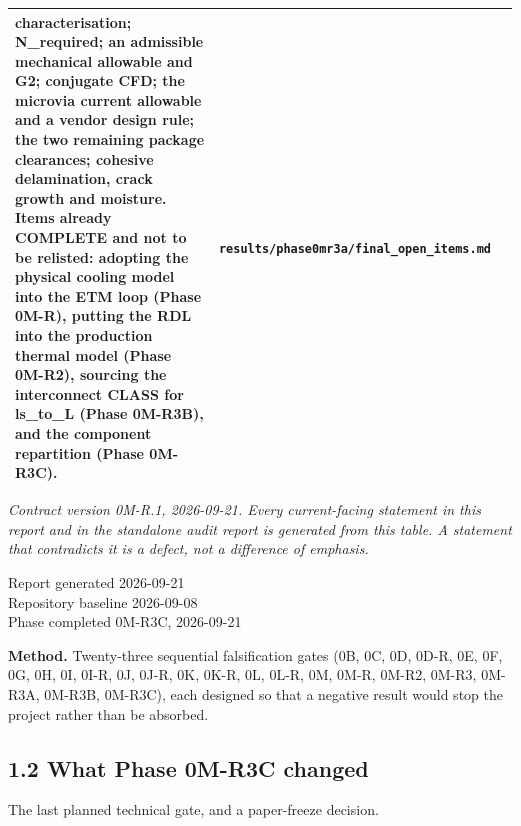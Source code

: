 \documentclass[10pt,]{article}
\begin{document}
\begin{longtable}[]{@{}lll@{}}
\begin{minipage}[t]{0.30\columnwidth}
{characterisation; N\_required; an admissible mechanical allowable and
G2; conjugate CFD; the microvia current allowable and a vendor design
rule; the two remaining package clearances; cohesive delamination, crack
growth and moisture. Items already COMPLETE and not to be relisted:
adopting the physical cooling model into the ETM loop (Phase 0M-R),
putting the RDL into the production thermal model (Phase 0M-R2),
sourcing the interconnect CLASS for ls\_to\_L (Phase 0M-R3B), and the
component repartition (Phase 0M-R3C).}\strut
\end{minipage} & \begin{minipage}[t]{0.30\columnwidth}\raggedright
\texttt{results/phase0mr3a/final\_open\_items.md}\strut
\end{minipage}\tabularnewline
\bottomrule
\end{longtable}

\emph{Contract version 0M-R.1, 2026-09-21. Every current-facing
statement in this report and in the standalone audit report is generated
from this table. A statement that contradicts it is a defect, not a
difference of emphasis.}

\newpage

Report generated \textbar{} 2026-09-21 \textbar{}\\
Repository baseline \textbar{} 2026-09-08 \textbar{}\\
Phase completed \textbar{} 0M-R3C, 2026-09-21 \textbar{}

\textbf{Method.} Twenty-three sequential falsification gates (0B, 0C,
0D, 0D-R, 0E, 0F, 0G, 0H, 0I, 0I-R, 0J, 0J-R, 0K, 0K-R, 0L, 0L-R, 0M,
0M-R, 0M-R2, 0M-R3, 0M-R3A, 0M-R3B, 0M-R3C), each designed so that a
negative result would stop the project rather than be absorbed.

\hypertarget{what-phase-0m-r3c-changed}{%
\subsection{1.2 What Phase 0M-R3C
changed}\label{what-phase-0m-r3c-changed}}

The last planned technical gate, and a paper-freeze decision.
\end{document}
